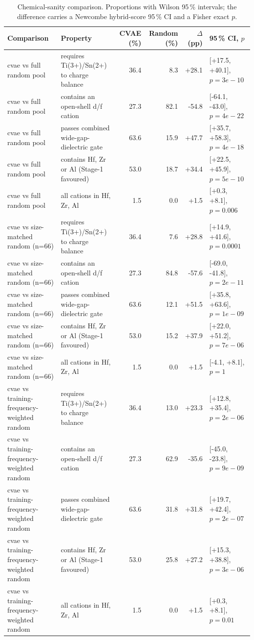 \begin{table}[t]
\centering
\small
\caption{Chemical-sanity comparison. Proportions with Wilson 95\,\% intervals; the difference carries a Newcombe hybrid-score 95\,\% CI and a Fisher exact $p$.}
\label{tab:a7_proportions}
\begin{tabular}{llrrrl}
\toprule
Comparison & Property & CVAE (\%) & Random (\%) & $\Delta$ (pp) & 95\,\% CI, $p$ \\
\midrule
cvae vs full random pool & requires Ti(3+)/Sn(2+) to charge balance & 36.4 & 8.3 & +28.1 & [+17.5, +40.1], $p=3e-10$ \\
cvae vs full random pool & contains an open-shell d/f cation & 27.3 & 82.1 & -54.8 & [-64.1, -43.0], $p=4e-22$ \\
cvae vs full random pool & passes combined wide-gap-dielectric gate & 63.6 & 15.9 & +47.7 & [+35.7, +58.3], $p=4e-18$ \\
cvae vs full random pool & contains Hf, Zr or Al (Stage-1 favoured) & 53.0 & 18.7 & +34.4 & [+22.5, +45.9], $p=5e-10$ \\
cvae vs full random pool & all cations in {Hf, Zr, Al} & 1.5 & 0.0 & +1.5 & [+0.3, +8.1], $p=0.006$ \\
\midrule
cvae vs size-matched random (n=66) & requires Ti(3+)/Sn(2+) to charge balance & 36.4 & 7.6 & +28.8 & [+14.9, +41.6], $p=0.0001$ \\
cvae vs size-matched random (n=66) & contains an open-shell d/f cation & 27.3 & 84.8 & -57.6 & [-69.0, -41.8], $p=2e-11$ \\
cvae vs size-matched random (n=66) & passes combined wide-gap-dielectric gate & 63.6 & 12.1 & +51.5 & [+35.8, +63.6], $p=1e-09$ \\
cvae vs size-matched random (n=66) & contains Hf, Zr or Al (Stage-1 favoured) & 53.0 & 15.2 & +37.9 & [+22.0, +51.2], $p=7e-06$ \\
cvae vs size-matched random (n=66) & all cations in {Hf, Zr, Al} & 1.5 & 0.0 & +1.5 & [-4.1, +8.1], $p=1$ \\
\midrule
cvae vs training-frequency-weighted random & requires Ti(3+)/Sn(2+) to charge balance & 36.4 & 13.0 & +23.3 & [+12.8, +35.4], $p=2e-06$ \\
cvae vs training-frequency-weighted random & contains an open-shell d/f cation & 27.3 & 62.9 & -35.6 & [-45.0, -23.8], $p=9e-09$ \\
cvae vs training-frequency-weighted random & passes combined wide-gap-dielectric gate & 63.6 & 31.8 & +31.8 & [+19.7, +42.4], $p=2e-07$ \\
cvae vs training-frequency-weighted random & contains Hf, Zr or Al (Stage-1 favoured) & 53.0 & 25.8 & +27.2 & [+15.3, +38.8], $p=3e-06$ \\
cvae vs training-frequency-weighted random & all cations in {Hf, Zr, Al} & 1.5 & 0.0 & +1.5 & [+0.3, +8.1], $p=0.01$ \\
\bottomrule
\end{tabular}
\end{table}

